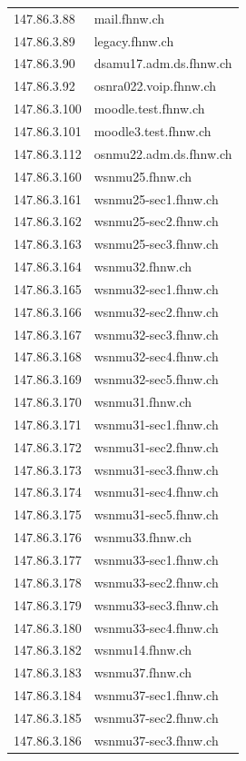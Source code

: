 \documentclass[a4paper,11pt]{scrartcl}
\begin{document}
\begin{longtable}{p{2.5cm}|p{7cm}}
	147.86.3.88 & mail.fhnw.ch \\ 
	147.86.3.89 & legacy.fhnw.ch \\ 
	147.86.3.90 & dsamu17.adm.ds.fhnw.ch \\ 
	147.86.3.92 & osnra022.voip.fhnw.ch \\ 
	147.86.3.100 & moodle.test.fhnw.ch \\ 
	147.86.3.101 & moodle3.test.fhnw.ch \\ 
	147.86.3.112 & osnmu22.adm.ds.fhnw.ch \\ 
	147.86.3.160 & wsnmu25.fhnw.ch \\ 
	147.86.3.161 & wsnmu25-sec1.fhnw.ch \\ 
	147.86.3.162 & wsnmu25-sec2.fhnw.ch \\ 
	147.86.3.163 & wsnmu25-sec3.fhnw.ch \\ 
	147.86.3.164 & wsnmu32.fhnw.ch \\ 
	147.86.3.165 & wsnmu32-sec1.fhnw.ch \\ 
	147.86.3.166 & wsnmu32-sec2.fhnw.ch \\ 
	147.86.3.167 & wsnmu32-sec3.fhnw.ch \\ 
	147.86.3.168 & wsnmu32-sec4.fhnw.ch \\ 
	147.86.3.169 & wsnmu32-sec5.fhnw.ch \\ 
	147.86.3.170 & wsnmu31.fhnw.ch \\ 
	147.86.3.171 & wsnmu31-sec1.fhnw.ch \\ 
	147.86.3.172 & wsnmu31-sec2.fhnw.ch \\ 
	147.86.3.173 & wsnmu31-sec3.fhnw.ch \\ 
	147.86.3.174 & wsnmu31-sec4.fhnw.ch \\ 
	147.86.3.175 & wsnmu31-sec5.fhnw.ch \\ 
	147.86.3.176 & wsnmu33.fhnw.ch \\ 
	147.86.3.177 & wsnmu33-sec1.fhnw.ch \\ 
	147.86.3.178 & wsnmu33-sec2.fhnw.ch \\ 
	147.86.3.179 & wsnmu33-sec3.fhnw.ch \\ 
	147.86.3.180 & wsnmu33-sec4.fhnw.ch \\ 
	147.86.3.182 & wsnmu14.fhnw.ch \\ 
	147.86.3.183 & wsnmu37.fhnw.ch \\ 
	147.86.3.184 & wsnmu37-sec1.fhnw.ch \\ 
	147.86.3.185 & wsnmu37-sec2.fhnw.ch \\ 
	147.86.3.186 & wsnmu37-sec3.fhnw.ch \\ 

\end{longtable}
\end{document}
